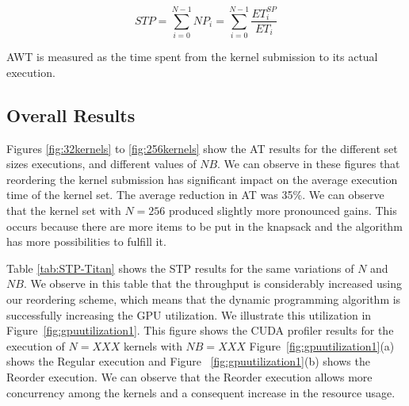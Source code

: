 \documentclass[conference]{IEEEtran}
\begin{document}
\begin{equation}
STP = \sum_{i=0}^{N-1} NP_i = \sum_{i=0}^{N-1} \frac{ET^{SP}_i}{ET_i}
\end{equation}

AWT is measured as the time spent from the kernel submission to its actual execution.

\subsection{Overall Results}

Figures \ref{fig:32kernels} to \ref{fig:256kernels} show the AT results for the different set sizes executions, and different values of $NB$. We can observe in these figures that reordering the kernel submission has significant impact on the average execution time of the kernel set. The average reduction in AT was 35\%. We can observe that the kernel set with $N=256$ produced slightly more pronounced gains. This occurs because there are more items to be put in the knapsack and the algorithm has more possibilities to fulfill it.

Table \ref{tab:STP-Titan} shows the STP results for the same variations of $N$ and $NB$. We observe in this table that the throughput is considerably increased using our reordering scheme, which means that the dynamic programming algorithm is successfully increasing the GPU utilization. We illustrate this utilization in Figure~\ref{fig:gpuutilization1}. This figure shows the CUDA profiler results for the execution of $N=XXX$ kernels with $NB=XXX$ Figure~\ref{fig:gpuutilization1}(a) shows the Regular execution and Figure ~\ref{fig:gpuutilization1}(b) shows the Reorder execution. We can observe that the Reorder execution allows more concurrency among the kernels and a consequent increase in the resource usage. 
\end{document}
